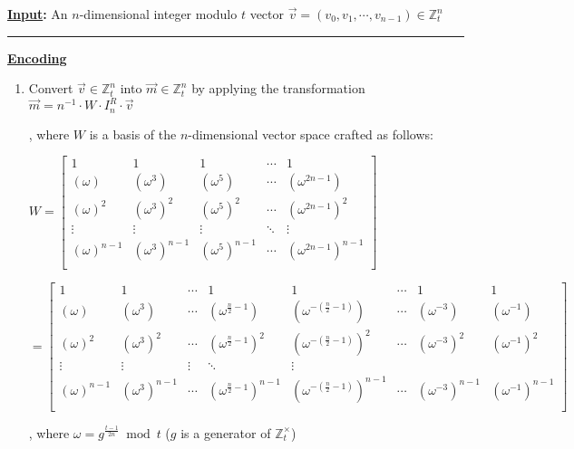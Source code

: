 \begin{tcolorbox}[title={\textbf{\tboxlabel{\ref*{subsubsec:bfv-encoding-summary}} BFV's Encoding and Decoding}}]



\textbf{\underline{Input}:} An $n$-dimensional integer modulo $t$ vector $\vec{v} = (v_0, v_1, \cdots, v_{n-1}) \in \mathbb{Z}_t^n$

\par\noindent\rule{\textwidth}{0.4pt}

\textbf{\underline{Encoding}} 
\begin{enumerate}

\item Convert $\vec{v} \in \mathbb{Z}_t^n$ into $\vec{m} \in \mathbb{Z}_t^n$ by applying the transformation $\vec{m} = n^{-1}\cdot W \cdot I_n^R \cdot \vec{v}$

, where $W$ is a basis of the $n$-dimensional vector space crafted as follows: 

$W =  \begin{bmatrix}
1 & 1 & 1 & \cdots & 1\\
(\omega) & (\omega^3) & (\omega^5) & \cdots & (\omega^{2n-1})\\
(\omega)^2 & (\omega^3)^2 & (\omega^5)^2 & \cdots & (\omega^{2n-1})^2\\
\vdots & \vdots & \vdots & \ddots & \vdots \\
(\omega)^{n-1} & (\omega^3)^{n-1} & (\omega^5)^{n-1} & \cdots & (\omega^{2n-1})^{n-1}\\
\end{bmatrix}$

$= \begin{bmatrix}
1 & 1 & \cdots & 1 & 1 & \cdots & 1 & 1\\
(\omega) & (\omega^3) & \cdots & (\omega^{\frac{n}{2} - 1}) & (\omega^{-(\frac{n}{2} - 1)}) & \cdots & (\omega^{-3}) & (\omega^{-1})\\
(\omega)^2 & (\omega^3)^2 & \cdots & (\omega^{\frac{n}{2} - 1})^2 & (\omega^{-(\frac{n}{2} - 1)})^2 & \cdots & (\omega^{-3})^2 & (\omega^{-1})^2\\
\vdots & \vdots & \vdots & \ddots & \vdots \\
(\omega)^{n-1} & (\omega^3)^{n-1} & \cdots & (\omega^{\frac{n}{2} - 1})^{n-1} & (\omega^{-(\frac{n}{2} - 1)})^{n-1} & \cdots & (\omega^{-3})^{n-1} & (\omega^{-1})^{n-1}\\
\end{bmatrix}$

, where $\omega = g^{\frac{t - 1}{2n}} \bmod t$ ($g$ is a generator of $\mathbb{Z}_t^{\times}$)



\end{enumerate}
\end{tcolorbox}
